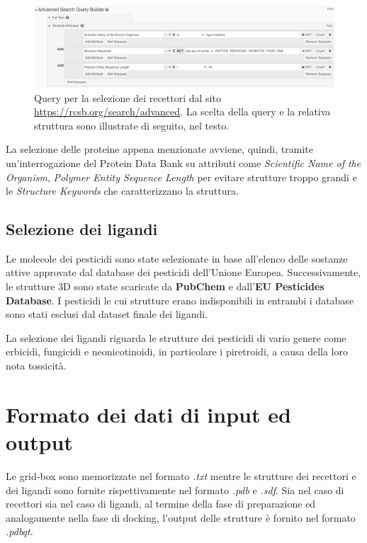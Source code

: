 \begin{figure}
    \centering
    \includegraphics[scale=0.45]{images/chapter3/rcsb_query.jpg}
    \caption[Query per la selezione dei recettori.]{Query per la selezione dei recettori dal sito\\ \url{https://rcsb.org/search/advanced}. La scelta della query e la relativa struttura sono illustrate di seguito, nel testo.}
    \label{fig:rcsb_query}
\end{figure}

La selezione delle proteine appena menzionate avviene, quindi, tramite un'interrogazione del Protein Data Bank su attributi come \textit{Scientific Name of the Organism}, \textit{Polymer Entity Sequence Length} per evitare strutture troppo grandi e le \textit{Structure Keywords} che caratterizzano la struttura.

\subsection{Selezione dei ligandi}
Le molecole dei pesticidi sono state selezionate in base all'elenco delle sostanze attive approvate dal database dei pesticidi dell'Unione Europea. Successivamente, le strutture 3D sono state scaricate da \textbf{PubChem} e dall'\textbf{EU Pesticides Database}. 
I pesticidi le cui strutture erano indisponibili in entrambi i database sono stati esclusi dal dataset finale dei ligandi.

La selezione dei ligandi riguarda le strutture dei pesticidi di vario genere come erbicidi, fungicidi e neonicotinoidi, in particolare i piretroidi, a causa della loro nota tossicità.  


\section{Formato dei dati di input ed output}
Le grid-box sono memorizzate nel formato \textit{.txt} mentre le strutture dei recettori e dei ligandi sono fornite rispettivamente nel formato \textit{.pdb} e \textit{.sdf}.
Sia nel caso di recettori sia nel caso di ligandi, al termine della fase di preparazione ed analogamente nella fase di docking, l'output delle strutture è fornito nel formato \textit{.pdbqt}.

